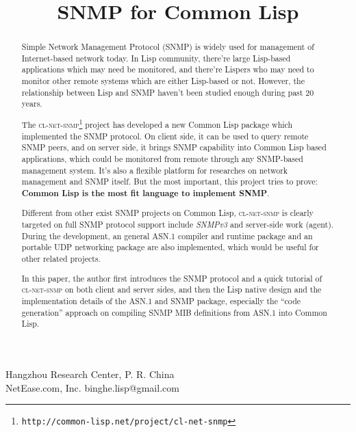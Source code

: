 \documentclass[reprint,9pt]{sigplanconf}
\begin{document}
\copyrightdata{}

\toappear{}


\title{SNMP for Common Lisp}

           {Hangzhou Research Center, P. R. China\\NetEase.com, Inc.}
           {binghe.lisp@gmail.com}

\maketitle

\begin{abstract}
  Simple Network Management Protocol (SNMP) is widely used for management of
  Internet-based network today. In Lisp community, there're large Lisp-based
  applications which may need be monitored, and there're Lispers who may need
  to monitor other remote systems which are either Lisp-based or not.
  However, the relationship between Lisp and SNMP haven't been studied enough
  during past 20 years.
  
  The
  \textsc{cl-net-snmp}\footnote{\texttt{http://common-lisp.net/project/cl-net-snmp}}
  project has developed a new Common Lisp package which implemented the
  SNMP protocol. On client side, it can be used to query remote SNMP peers,
  and on server side, it brings SNMP capability into Common Lisp based applications,
  which could be monitored from remote through any SNMP-based management system.
  It's also a flexible platform for researches on network management and SNMP itself.
  But the most important, this project tries to prove: \textbf{Common Lisp is the most
  fit language to implement SNMP}.

  Different from other exist SNMP projects on Common Lisp,
  \textsc{cl-net-snmp} is clearly targeted on full SNMP
  protocol support include \textsl{SNMPv3} and server-side work (agent). During
  the development, an general ASN.1 compiler and runtime package and
  an portable UDP networking
  package are also implemented, which would be useful for other related
  projects.

  In this paper, the author first introduces the SNMP protocol and
  a quick tutorial of \textsc{cl-net-snmp}
  on both client and server sides, and then the Lisp native design
  and the implementation details of the ASN.1 and SNMP package,
  especially the ``code generation'' approach on compiling SNMP MIB
  definitions from ASN.1 into Common Lisp.
\end{abstract}
\end{document}

